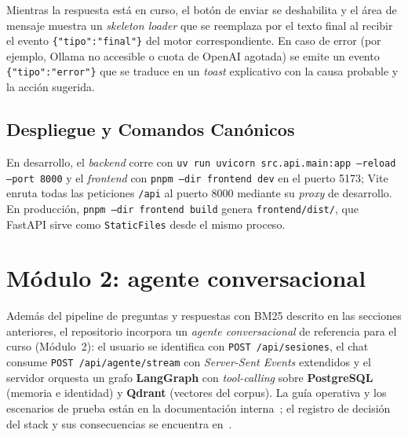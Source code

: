 \documentclass[conference]{IEEEtran}
\newcommand{\code}[1]{\texttt{\small #1}}
\begin{document}
Mientras la respuesta está en curso, el botón de enviar se deshabilita y
el área de mensaje muestra un \textit{skeleton loader} que se reemplaza
por el texto final al recibir el evento \code{\{"tipo":"final"\}} del
motor correspondiente. En caso de error (por ejemplo, Ollama no
accesible o cuota de OpenAI agotada) se emite un evento
\code{\{"tipo":"error"\}} que se traduce en un \textit{toast} explicativo
con la causa probable y la acción sugerida.

\subsection{Despliegue y Comandos Canónicos}

En desarrollo, el \textit{backend} corre con
\code{uv run uvicorn src.api.main:app --reload --port 8000} y el
\textit{frontend} con \code{pnpm --dir frontend dev} en el puerto 5173;
Vite enruta todas las peticiones \code{/api} al puerto 8000 mediante su
\textit{proxy} de desarrollo. En producción, \code{pnpm --dir frontend
build} genera \code{frontend/dist/}, que FastAPI sirve como
\code{StaticFiles} desde el mismo proceso.

\section{Módulo 2: agente conversacional}
\label{sec:m2_agente}

Además del pipeline de preguntas y respuestas con BM25 descrito en las
secciones anteriores, el repositorio incorpora un \textit{agente
conversacional} de referencia para el curso (Módulo~2): el usuario se
identifica con \code{POST /api/sesiones}, el chat consume
\code{POST /api/agente/stream} con \textit{Server-Sent Events} extendidos y
el servidor orquesta un grafo \textbf{LangGraph} con \textit{tool-calling}
sobre \textbf{PostgreSQL} (memoria e identidad) y \textbf{Qdrant} (vectores
del corpus). La guía operativa y los escenarios de prueba están en la
documentación interna~\cite{doc003m2}; el registro de decisión del stack y
sus consecuencias se encuentra en~\cite{decision3m2}.
\end{document}
